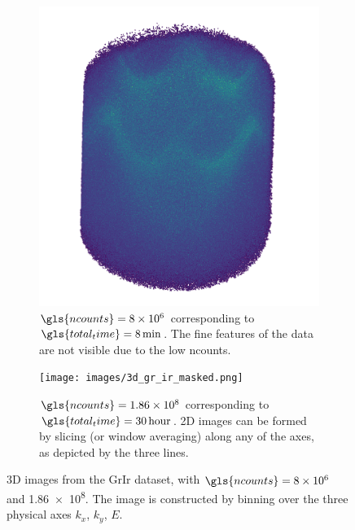 \begin{figure}[h]
    \centering
    \begin{subfigure}[t]{0.49\linewidth}
        \centering
        \includegraphics[width=1\linewidth]{images/3d_gr_ir_8M.png}
        \caption{$\gls{ncounts}=\num{8e6}$ corresponding to $\gls{total_time}=\qty{8}{min}$. The fine features of the data are not visible due to the low \gls{ncounts}.}
        \label{fig:3d-gr-ir-8M}
    \end{subfigure}
    \hfill
    \begin{subfigure}[t]{0.49\linewidth}
        \centering
        \texttt{[image: images/3d\_gr\_ir\_masked.png]}
        \caption{$\gls{ncounts}=\num{1.86e8}$ corresponding to $\gls{total_time}=\qty{30}{hour}$. 2D images can be formed by slicing (or window averaging) along any of the axes, as depicted by the three lines.}
        \label{fig:3d-gr-ir-186M}
    \end{subfigure}
    \caption{3D images from the \gls{GrIr} dataset, with $\gls{ncounts}=\num{8e6}$  and \num{1.86e8}. The image is constructed by binning over the three physical axes $k_x$, $k_y$, $E$.}
    \label{fig:3d-gr-ir}
\end{figure}

